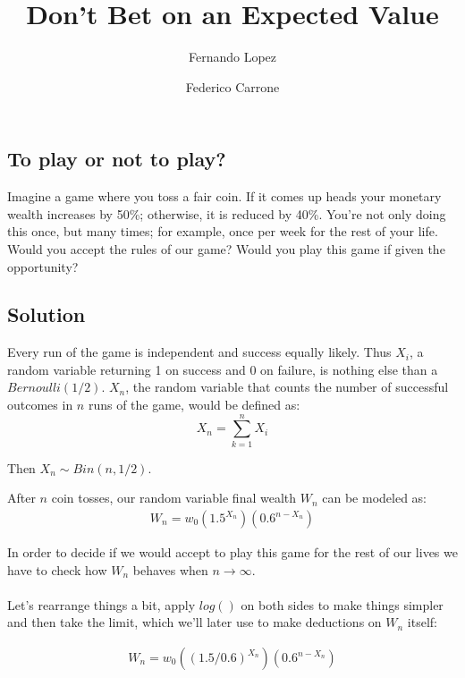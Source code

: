 \documentclass[12pt]{article}
\title{Don't Bet on an Expected Value}
\author{Fernando Lopez \and Federico Carrone}
\begin{document}
\maketitle
{}

\subsection{To play or not to play?}

Imagine a game where you toss a fair coin. If it comes up heads your monetary wealth increases by 50\%; otherwise, it is reduced by 40\%. You’re not only doing this once, but many times; for example, once per week for the rest of your life. Would you accept the rules of our game? Would you play this game if given the opportunity?

\subsection{Solution}
Every run of the game is independent and success equally likely. Thus $X_i$, a random variable returning 1 on success and 0 on failure, is nothing else than a $Bernoulli(1/2)$. $X_n$, the random variable that counts the number of successful outcomes in $n$ runs of the game, would be defined as:
\begin{equation*}
 X_n = \sum\limits_{k=1}^{n} X_i
\end{equation*}

Then $X_n \sim Bin(n, 1/2)$.

After $n$ coin tosses, our random variable final wealth $W_n$ can be modeled as:
\begin{align}
  \begin{equation*}
    W_n = w_0 \left(1.5^{X_n}\right)\left(0.6^{n-X_n}\right)
  \end{equation*}
\end{align}

In order to decide if we would accept to play this game for the rest of our lives we have to check how $W_n$ behaves when $n \rightarrow \infty$.
\\\\

Let's rearrange things a bit, apply $log()$ on both sides to make things simpler and then take the limit, which we'll later use to make deductions on $W_n$ itself:

\begin{align}
    \begin{equation*}
        W_n = w_0 \left((1.5/0.6)^{X_n}\right) \left(0.6^{n - X_n}\right)
    \end{equation*}
\end{align}
\end{document}
